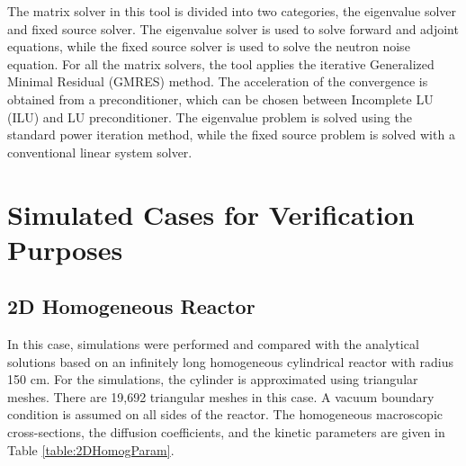 The matrix solver in this tool is divided into two categories, the eigenvalue solver and fixed source solver. The eigenvalue solver is used to solve forward and adjoint equations, while the fixed source solver is used to solve the neutron noise equation. For all the matrix solvers, the tool applies the iterative Generalized Minimal Residual (GMRES) method. The acceleration of the convergence is obtained from a preconditioner, which can be chosen between Incomplete LU (ILU) and LU preconditioner. The eigenvalue problem is solved using the standard power iteration method, while the fixed source problem is solved with a conventional linear system solver.

\section{Simulated Cases for Verification Purposes}
\label{sec:simulated_vandv}

\subsection{2D Homogeneous Reactor}

In this case, simulations were performed and compared with the analytical solutions based on an infinitely long homogeneous cylindrical reactor with radius 150 cm. For the simulations, the cylinder is approximated using triangular meshes. There are 19,692 triangular meshes in this case. A vacuum boundary condition is assumed on all sides of the reactor. The homogeneous macroscopic cross-sections, the diffusion coefficients, and the kinetic parameters are given in Table \ref{table:2DHomogParam}. 

